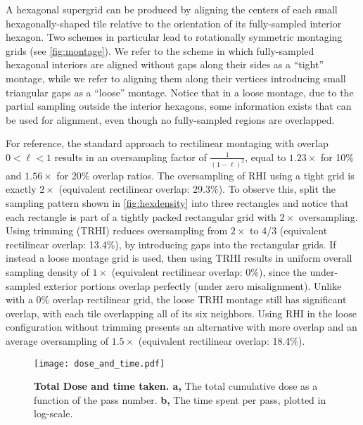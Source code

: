 \documentclass[aip, amsmath, amssymb, nobibnotes, nofootinbib, citeautoscript, reprint, superscriptaddress]{revtex4-2}
\begin{document}
    A hexagonal supergrid can be produced by aligning the centers of each small hexagonally-shaped tile relative to the orientation of its fully-sampled interior hexagon.
    Two schemes in particular lead to rotationally symmetric montaging grids (see \autoref{fig:montage}).
    We refer to the scheme in which fully-sampled hexagonal interiors are aligned without gaps along their sides as a ``tight'' montage, while we refer to aligning them along their vertices introducing small triangular gaps as a ``loose'' montage.
    Notice that in a loose montage, due to the partial sampling outside the interior hexagons, some information exists that can be used for alignment, even though no fully-sampled regions are overlapped.


    For reference, the standard approach to rectilinear montaging with overlap $0<\ell<1$ results in an oversampling factor of $\frac{1}{(1-\ell)^2}$, equal to $1.23\times$ for 10\% and $1.56\times$ for 20\% overlap ratios.
    The oversampling of RHI using a tight grid is exactly $2\times$ (equivalent rectilinear overlap: 29.3\%).
    To observe this, split the sampling pattern shown in \autoref{fig:hexdensity} into three rectangles and notice that each rectangle is part of a tightly packed rectangular grid with $2\times$ oversampling.
    Using trimming (TRHI) reduces oversampling from $2\times$ to 4/3 (equivalent rectilinear overlap: 13.4\%), by introducing gaps into the rectangular grids.
    If instead a loose montage grid is used, then using TRHI results in uniform overall sampling density of $1\times$ (equivalent rectilinear overlap: 0\%), since the under-sampled exterior portions overlap perfectly (under zero misalignment).
    Unlike with a 0\% overlap rectilinear grid, the loose TRHI montage still has significant overlap, with each tile overlapping all of its six neighbors.
    Using RHI in the loose configuration without trimming presents an alternative with more overlap and an average oversampling of $1.5\times$ (equivalent rectilinear overlap: 18.4\%).
    
    \begin{figure*}
        \texttt{[image: dose\_and\_time.pdf]}
        \caption{
        \label{fig:dose} 
            \textbf{Total Dose and time taken. a,} The total cumulative dose as a function of the pass number. \textbf{b,} The time spent per pass, plotted in log-scale.
        }
    \end{figure*}
\end{document}
